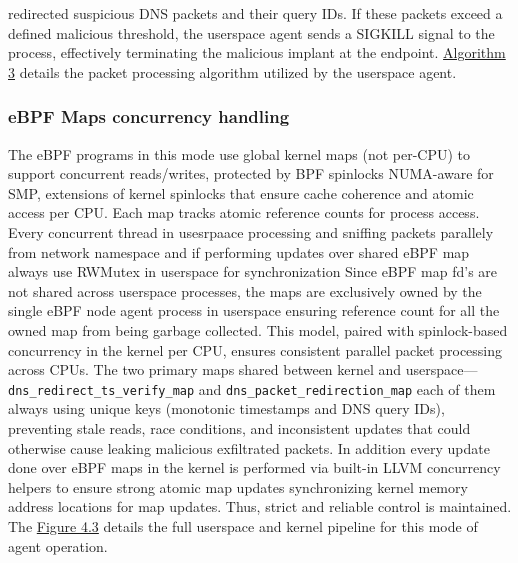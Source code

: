 \documentclass [11pt, proquest] {uwthesis}[2020/02/24]
\begin{document}
redirected suspicious DNS packets and their query IDs. If these packets exceed a defined malicious threshold, the userspace agent sends a SIGKILL signal to the process, effectively terminating the malicious implant at the endpoint.
\hyperref[sec:alg3]{Algorithm 3} details the packet processing algorithm utilized by the userspace agent.


\subsubsection{\textbf{eBPF Maps concurrency handling}}
\label{active:sec3}
The eBPF programs in this mode use global kernel maps (not per-CPU) to support concurrent reads/writes, protected by BPF spinlocks NUMA-aware for SMP, extensions of kernel spinlocks that ensure cache coherence and atomic access per CPU. Each map tracks atomic reference counts for process access. Every concurrent thread in usesrpaace processing and sniffing packets parallely from network namespace and if performing updates over shared eBPF map always use RWMutex in userspace for synchronization Since eBPF map fd's are not shared across userspace processes, the maps are exclusively owned by the single eBPF node agent process in userspace ensuring reference count for all the owned map from being garbage collected. This model, paired with spinlock-based concurrency in the kernel per CPU, ensures consistent parallel packet processing across CPUs. The two primary maps shared between kernel and userspace—\texttt{dns\_redirect\_ts\_verify\_map} and \texttt{dns\_packet\_redirection\_map} each of them always using unique keys (monotonic timestamps and DNS query IDs), preventing stale reads, race conditions, and inconsistent updates that could otherwise cause leaking malicious exfiltrated packets. In addition every update done over eBPF maps in the kernel is performed via built-in LLVM concurrency helpers to ensure strong atomic map updates synchronizing kernel memory address locations for map updates. Thus, strict and reliable control is maintained. The \hyperref[sec:dp-active-phase]{Figure 4.3} details the full userspace and kernel pipeline for this mode of agent operation. 
\end{document}
